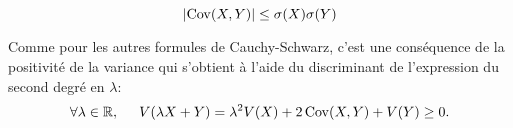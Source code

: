 \begin{prop}
 \begin{displaymath}
  \left|\mathop{\mathrm{Cov}}(X,Y)\right|\leq \sigma(X)\sigma(Y)
 \end{displaymath}
\end{prop}
\begin{demo}
  Comme pour les autres formules de Cauchy-Schwarz, c'est une conséquence de la positivité de la variance qui s'obtient à l'aide du discriminant de l'expression du second degré en $\lambda$: 
\[
  \forall \lambda \in \mathbb{R}, \hspace{0.5cm} V(\lambda X + Y) = \lambda^2 V(X) + 2\mathop{\mathrm{Cov}}(X,Y) + V(Y) \geq 0.
\]

\end{demo}


